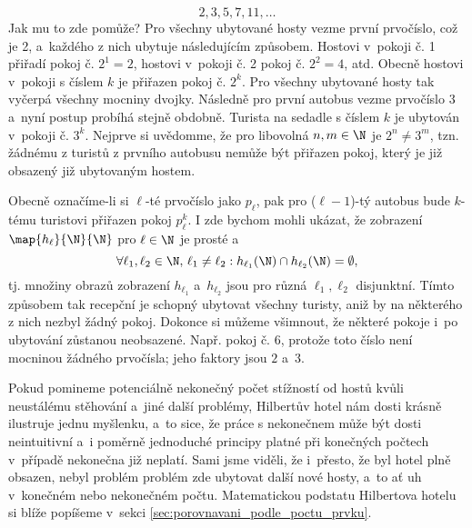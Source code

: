 \begin{enumerate}[label=\textit{(\roman*)}]
    \begin{equation*}
        2,3,5,7,11,\dots
    \end{equation*}
    Jak mu to zde pomůže? Pro všechny ubytované hosty vezme první prvočíslo, což je 2, a~každého z nich ubytuje následujícím způsobem. Hostovi v~pokoji č. 1 přiřadí pokoj č. $2^1=2$, hostovi v~pokoji č. 2 pokoj č. $2^2=4$, atd. Obecně hostovi v~pokoji s číslem $k$ je přiřazen pokoj č. $2^k$. Pro všechny ubytované hosty tak vyčerpá všechny mocniny dvojky. Následně pro první autobus vezme prvočíslo 3 a~nyní postup probíhá stejně obdobně. Turista na sedadle s číslem $k$ je ubytován v~pokoji č. $3^k$. Nejprve si uvědomme, že pro libovolná $n,m\in\N$ je $2^n\neq 3^m$, tzn. žádnému z turistů z prvního autobusu nemůže být přiřazen pokoj, který je již obsazený již ubytovaným hostem.\par
    Obecně označíme-li si $\ell$-té prvočíslo jako $p_\ell$, pak pro ($\ell-1$)-tý autobus bude $k$-tému turistovi přiřazen pokoj $p_\ell^k$. I zde bychom mohli ukázat, že zobrazení $\map{h_\ell}{\N}{\N}$ pro $\ell\in\N$ je prosté a
    \begin{equation*}
        \forall\ell_1,\ell_2\in\N,\,\ell_1\neq\ell_2: h_{\ell_1}(\N)\cap h_{\ell_2}(\N)=\emptyset,
    \end{equation*}
    tj. množiny obrazů zobrazení $h_{\ell_1}$ a~$h_{\ell_2}$ jsou pro různá $\ell_1,\ell_2$ disjunktní. Tímto způsobem tak recepční je schopný ubytovat všechny turisty, aniž by na některého z nich nezbyl žádný pokoj. Dokonce si můžeme všimnout, že některé pokoje i~po ubytování zůstanou neobsazené. Např. pokoj č. 6, protože toto číslo není mocninou žádného prvočísla; jeho faktory jsou $2$ a~$3$.
\end{enumerate}
Pokud pomineme potenciálně nekonečný počet stížností od hostů kvůli neustálému stěhování a~jiné další problémy, Hilbertův hotel nám dosti krásně ilustruje jednu myšlenku, a~to sice, že práce s nekonečnem může být dosti neintuitivní a~i poměrně jednoduché principy platné při konečných počtech v~případě nekonečna již neplatí. Sami jsme viděli, že i~přesto, že byl hotel plně obsazen, nebyl problém problém zde ubytovat další nové hosty, a~to ať uh v~konečném nebo nekonečném počtu. Matematickou podstatu Hilbertova hotelu si blíže popíšeme v~sekci \ref{sec:porovnavani_podle_poctu_prvku}.